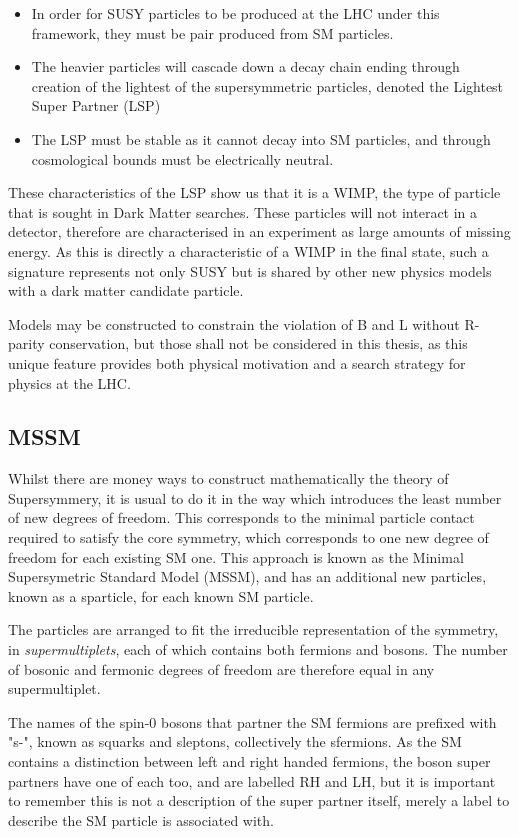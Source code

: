 \begin{itemize}
\item{In order for SUSY particles to be produced at the LHC under this framework, they must be pair produced from SM particles.} 

\item{The heavier particles will cascade down a decay chain ending through creation of the lightest of the supersymmetric particles, denoted the Lightest Super Partner (LSP)}

\item{The LSP must be stable as it cannot decay into SM particles, and through cosmological bounds must be electrically neutral.} 
\end{itemize}
These characteristics of the LSP show us that it is a WIMP, the type of particle that is sought in Dark Matter searches.  These particles will not interact in a detector, therefore are characterised in an experiment as large amounts of missing energy. As this is directly a characteristic of a WIMP in the final state, such a signature represents not only SUSY but is shared by other new physics models with a dark matter candidate particle. 

Models may be constructed to constrain the violation of B and L without R-parity conservation, but those shall not be considered in this thesis, as this unique feature provides both physical motivation and a search strategy for physics at the LHC.


\subsection{MSSM} 

Whilst there are money ways to construct mathematically the theory of Supersymmery, it is usual to do it in the way which introduces the least number of new degrees of freedom. This corresponds to the minimal particle contact required to satisfy the core symmetry, which corresponds to one new degree of freedom for each existing SM one. This approach is known as the Minimal Supersymetric Standard Model (MSSM), and has an additional new particles, known as a sparticle, for each known SM particle. 

The particles are arranged to fit the irreducible representation of the symmetry, in \textit{supermultiplets}, each of which contains both fermions and bosons. The number of bosonic and fermonic degrees of freedom are therefore equal in any supermultiplet. 

The names of the spin-0 bosons that partner the SM fermions are prefixed with "s-", known as squarks and sleptons, collectively the sfermions. As the SM contains a distinction between left and right handed fermions, the boson super partners have one of each too, and are labelled RH and LH, but it is important to remember this is not a description of the super partner itself, merely a label to describe the SM particle is associated with. 

